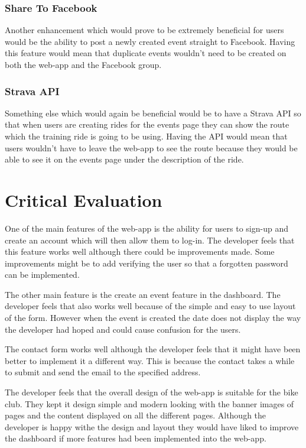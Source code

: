 \documentclass[10pt, a4paper]{article}
\begin{document}
    \subsubsection{Share To Facebook}
    Another enhancement which would prove to be extremely beneficial for users would be the ability to post a newly created event straight to Facebook. Having this feature would mean that duplicate events wouldn't need to be created on both the web-app and the Facebook group.  
    
    \subsubsection{Strava API}
    Something else which would again be beneficial would be to have a Strava API so that when users are creating rides for the events page they can show the route which the training ride is going to be using. Having the API would mean that users wouldn't have to leave the web-app to see the route because they would be able to see it on the events page under the description of the ride.
    
    \section{Critical Evaluation}
    One of the main features of the web-app is the ability for users to sign-up and create an account which will then allow them to log-in. The developer feels that this feature works well although there could be improvements made. Some improvements might be to add verifying the user so that a forgotten password can be implemented. 
    
    The other main feature is the create an event feature in the dashboard. The developer feels that also works well because of the simple and easy to use layout of the form. However when the event is created the date does not display the way the developer had hoped and could cause confusion for the users.
    
    The contact form works well although the developer feels that it might have been better to implement it a different way. This is because the contact takes a while to submit and send the email to the specified address. 
    
    The developer feels that the overall design of the web-app is suitable for the bike club. They kept it design simple and modern looking with the banner images of pages and the content displayed on all the different pages. Although the developer is happy withe the design and layout they would have liked to improve the dashboard if more features had been implemented into the web-app. 
    
\end{document}

